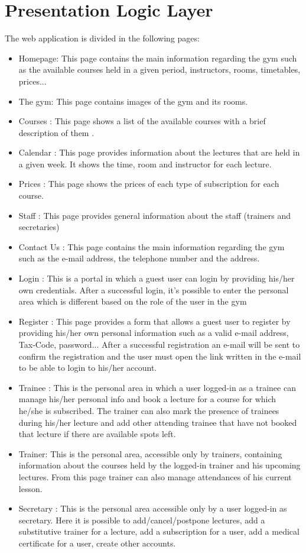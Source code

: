 \section{Presentation Logic Layer}


The web application is divided in the following pages:
\begin{itemize}
	\item Homepage: This page contains the main information regarding the gym such as the available courses held in a given period, instructors, rooms, timetables, prices...
	\item The gym: This page contains images of the gym and its rooms.
	\item Courses : This page shows a list of the available courses with a brief description of them .
	\item Calendar : This page provides information about the lectures that are held in a given week. It shows the time, room and instructor for each lecture.
	\item Prices : This page shows the prices of each type of subscription for each course.
	\item Staff : This page provides general information about the staff (trainers and secretaries)
	\item Contact Us : This page contains the main information regarding the gym such as the e-mail address, the telephone number and the address.
	\item Login : This is a portal in which a guest user can login by providing his/her own credentials. After a successful login, it's possible to enter the personal area which is different based on the role of the user in the gym
	\item Register : This page provides a form that allows a guest user to register by providing his/her own personal information such as a valid e-mail address, Tax-Code, password... After a successful registration an e-mail will be sent to confirm the registration and the user must open the link written in the e-mail to be able to login to his/her account.
	\item Trainee : This is the personal area in which a user logged-in as a trainee can manage his/her personal info and book a lecture for a course for which he/she is subscribed. The trainer can also mark the presence of trainees during his/her lecture and add other attending trainee that have not booked that lecture if there are available spots left.
	\item Trainer: This  is the personal area, accessible only by trainers, containing information about the courses held by the logged-in trainer and his upcoming lectures. From this page trainer can also manage attendances of his current lesson.
	\item Secretary : This is the personal area accessible only by a user logged-in as secretary. Here it is possible to add/cancel/postpone lectures, add a substitutive trainer for a lecture, add a subscription for a user, add a medical certificate for a user, create other accounts.
\end{itemize}

